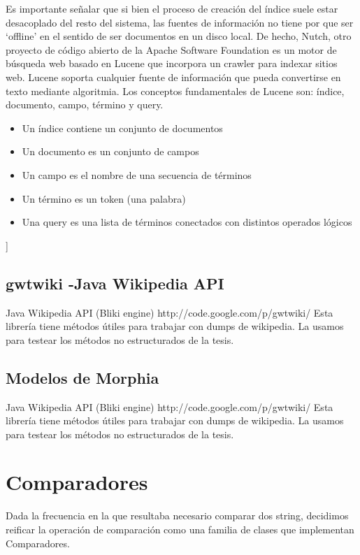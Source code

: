 Es importante señalar que si bien el proceso de creaci\'on del índice suele estar desacoplado del resto 
del sistema, las fuentes de informaci\'on no tiene por que ser `offline' en el sentido de ser documentos
en un disco local. De hecho, Nutch, otro proyecto de c\'odigo abierto de la Apache Software Foundation es 
un motor de búsqueda web basado en Lucene que incorpora un crawler para indexar sitios web. Lucene soporta 
cualquier fuente de informaci\'on que pueda convertirse en texto mediante algoritmia.
\newline
Los conceptos fundamentales de Lucene son: índice, documento, campo, término y query.
\begin{itemize}
\item Un índice contiene un conjunto de documentos
\item Un documento es un conjunto de campos
\item Un campo es el nombre de una secuencia de términos
\item Un término es un token (una palabra)
\item Una query es una lista de términos conectados con distintos operados l\'ogicos
\end{itemize}

\bigskip
[[Dar ejemplos de una query]]
\bigskip

\section{gwtwiki -Java Wikipedia API}\label{sec:gwtwiki}

Java Wikipedia API (Bliki engine)
http://code.google.com/p/gwtwiki/
Esta librería tiene métodos útiles para trabajar con dumps de wikipedia. La usamos para testear los métodos no estructurados de la tesis.


\section{Modelos de Morphia}\label{sec:modelos-morphia}

Java Wikipedia API (Bliki engine)
http://code.google.com/p/gwtwiki/
Esta librería tiene métodos útiles para trabajar con dumps de wikipedia. La usamos para testear los métodos no estructurados de la tesis.


\chapter{Comparadores}
\label{sec:comparadores}
Dada la frecuencia en la que resultaba necesario comparar dos string,
decidimos reificar la operación de comparación como una familia de
clases que implementan Comparadores. 

